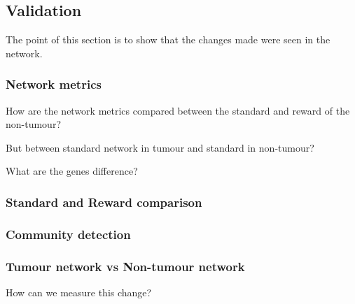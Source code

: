 \subsection{Validation} \label{s:N_II:validation}

The point of this section is to show that the changes made were seen in the network.


\subsubsection{Network metrics}

How are the network metrics compared between the standard and reward of the non-tumour?

But between standard network in tumour and standard in non-tumour?

What are the genes difference?



\subsubsection{Standard and Reward comparison}

\subsubsection{Community detection}

\subsubsection{Tumour network vs Non-tumour network}

How can we measure this change?